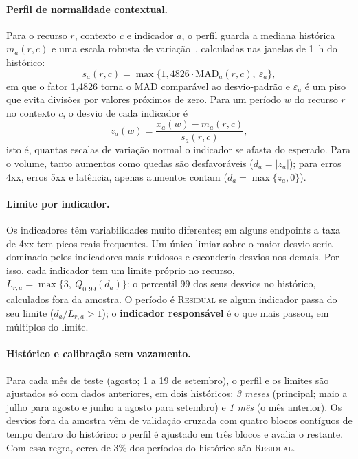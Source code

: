 \documentclass[sigconf,nonacm]{acmart}
\newcommand{\Residual}{\textsc{Residual}\xspace}
\begin{document}
\paragraph{Perfil de normalidade contextual.} Para o recurso $r$, contexto $c$ e indicador $a$, o perfil guarda a mediana histórica $m_a(r,c)$ e uma escala robusta de variação~\citep{leys2013mad}, calculadas nas janelas de 1~h do histórico:
\begin{equation}
  s_{a}(r,c)=\max\{1{,}4826\cdot\mathrm{MAD}_{a}(r,c),\ \varepsilon_a\},
\end{equation}
em que o fator 1,4826 torna o MAD comparável ao desvio-padrão e $\varepsilon_a$ é um piso que evita divisões por valores próximos de zero. Para um período $w$ do recurso $r$ no contexto $c$, o desvio de cada indicador é
\begin{equation}
  z_a(w)=\frac{x_a(w)-m_a(r,c)}{s_a(r,c)},
\end{equation}
isto é, quantas escalas de variação normal o indicador se afasta do esperado. Para o volume, tanto aumentos como quedas são desfavoráveis ($d_a=|z_a|$); para erros 4xx, erros 5xx e latência, apenas aumentos contam ($d_a=\max\{z_a,0\}$).

\paragraph{Limite por indicador.} Os indicadores têm variabilidades muito diferentes; em alguns endpoints a taxa de 4xx tem picos reais frequentes. Um único limiar sobre o maior desvio seria dominado pelos indicadores mais ruidosos e esconderia desvios nos demais. Por isso, cada indicador tem um limite próprio no recurso, $L_{r,a}=\max\{3,\ Q_{0{,}99}(d_a)\}$: o percentil 99 dos seus desvios no histórico, calculados fora da amostra. O período é \Residual se algum indicador passa do seu limite ($d_a/L_{r,a}>1$); o \textbf{indicador responsável} é o que mais passou, em múltiplos do limite.

\paragraph{Histórico e calibração sem vazamento.} Para cada mês de teste (agosto; 1 a 19 de setembro), o perfil e os limites são ajustados só com dados anteriores, em dois históricos: \emph{3 meses} (principal; maio a julho para agosto e junho a agosto para setembro) e \emph{1 mês} (o mês anterior). Os desvios fora da amostra vêm de validação cruzada com quatro blocos contíguos de tempo dentro do histórico: o perfil é ajustado em três blocos e avalia o restante. Com essa regra, cerca de 3\% dos períodos do histórico são \Residual.
\end{document}
